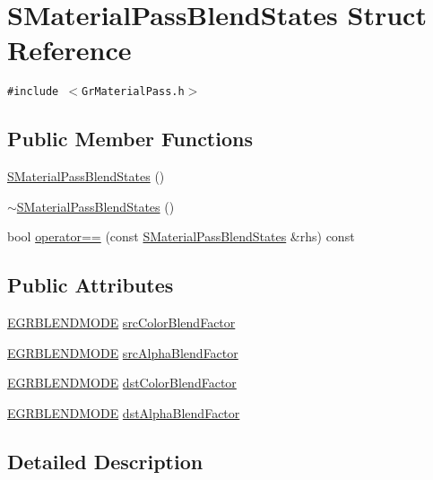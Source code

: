 \hypertarget{struct_s_material_pass_blend_states}{
\section{SMaterialPassBlendStates Struct Reference}
\label{struct_s_material_pass_blend_states}
}
{\tt \#include $<$GrMaterialPass.h$>$}

\subsection*{Public Member Functions}
\begin{CompactItemize}
\item 
\hyperlink{struct_s_material_pass_blend_states_3b8e98df5242bf29099839b42bdb7456}{SMaterialPassBlendStates} ()
\item 
\hyperlink{struct_s_material_pass_blend_states_01d143925b7b5e1e5dd9d57e6a2a7f2c}{$\sim$SMaterialPassBlendStates} ()
\item 
bool \hyperlink{struct_s_material_pass_blend_states_bf96120646a3703ba90c9848f7e4e266}{operator==} (const \hyperlink{struct_s_material_pass_blend_states}{SMaterialPassBlendStates} \&rhs) const 
\end{CompactItemize}
\subsection*{Public Attributes}
\begin{CompactItemize}
\item 
\hyperlink{_gr_util_8h_48d90fb7bec7d5ebb8c2bf20318961ec}{EGRBLENDMODE} \hyperlink{struct_s_material_pass_blend_states_fb1134ab25291932ab686cf72156a571}{srcColorBlendFactor}
\item 
\hyperlink{_gr_util_8h_48d90fb7bec7d5ebb8c2bf20318961ec}{EGRBLENDMODE} \hyperlink{struct_s_material_pass_blend_states_26219f41c410a0c020e84c2a7bc32eab}{srcAlphaBlendFactor}
\item 
\hyperlink{_gr_util_8h_48d90fb7bec7d5ebb8c2bf20318961ec}{EGRBLENDMODE} \hyperlink{struct_s_material_pass_blend_states_5e75b2942d23722d7886bccc5612d1b6}{dstColorBlendFactor}
\item 
\hyperlink{_gr_util_8h_48d90fb7bec7d5ebb8c2bf20318961ec}{EGRBLENDMODE} \hyperlink{struct_s_material_pass_blend_states_8c63ffc9017a3e850dbba2ecf9d55636}{dstAlphaBlendFactor}
\end{CompactItemize}


\subsection{Detailed Description}


